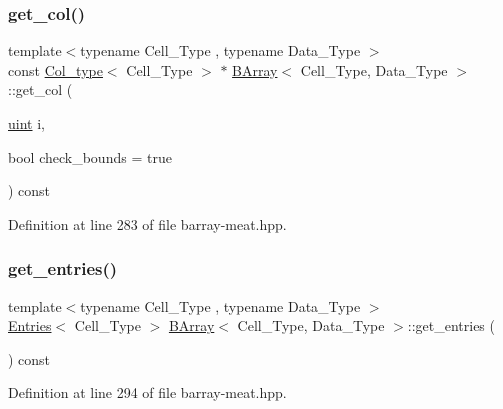 \subsubsection{\texorpdfstring{get\+\_\+col()}{get\_col()}}
{\footnotesize\ttfamily template$<$typename Cell\+\_\+\+Type , typename Data\+\_\+\+Type $>$ \\
const \hyperlink{typedefs_8hpp_a00f3fedec1671706175b572e5c57ee0b}{Col\+\_\+type}$<$ Cell\+\_\+\+Type $>$ $\ast$ \hyperlink{class_b_array}{B\+Array}$<$ Cell\+\_\+\+Type, Data\+\_\+\+Type $>$\+::get\+\_\+col (\begin{DoxyParamCaption}\item[{\hyperlink{typedefs_8hpp_a91ad9478d81a7aaf2593e8d9c3d06a14}{uint}}]{i,  }\item[{bool}]{check\+\_\+bounds = {\ttfamily true} }\end{DoxyParamCaption}) const\hspace{0.3cm}{\ttfamily [inline]}}



Definition at line 283 of file barray-\/meat.\+hpp.

\mbox{\label{class_b_array_aee224325422d214624771a5b4d91b55e}} 
\subsubsection{\texorpdfstring{get\+\_\+entries()}{get\_entries()}}
{\footnotesize\ttfamily template$<$typename Cell\+\_\+\+Type , typename Data\+\_\+\+Type $>$ \\
\hyperlink{class_entries}{Entries}$<$ Cell\+\_\+\+Type $>$ \hyperlink{class_b_array}{B\+Array}$<$ Cell\+\_\+\+Type, Data\+\_\+\+Type $>$\+::get\+\_\+entries (\begin{DoxyParamCaption}{ }\end{DoxyParamCaption}) const\hspace{0.3cm}{\ttfamily [inline]}}



Definition at line 294 of file barray-\/meat.\+hpp.

\mbox{\label{class_b_array_a2c969ceb1d37eff9ebcac25741de1808}} 
